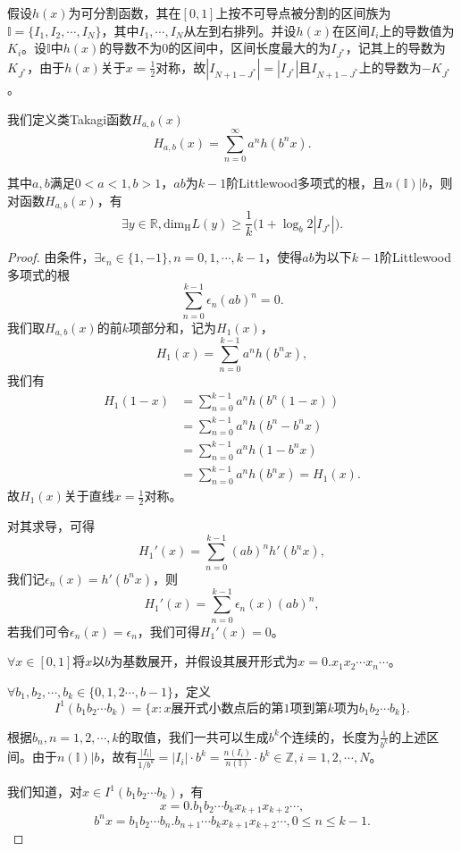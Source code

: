 假设$h(x)$为可分割函数，其在$[0,1]$上按不可导点被分割的区间族为$\mathbb{I}=\{I_1,I_2,\cdots,I_N\}$，其中$I_1,\cdots,I_N$从左到右排列。并设$h(x)$在区间$I_i$上的导数值为$K_i$。设$\mathbb{I}$中$h(x)$的导数不为$0$的区间中，区间长度最大的为$I_{J^*}$，记其上的导数为$K_{J^*}$，由于$h(x)$关于$x=\frac{1}{2}$对称，故$|I_{N+1-J^*}|=|I_{J^*}|$且$I_{N+1-J^*} $上的导数为$-K_{J^*}$。

我们定义类Takagi函数$H_{a,b}(x)$
$$
      H_{a,b}(x)=\sum_{n=0}^\infty a^nh(b^nx).
$$

其中$a,b$满足$0<a<1,b>1$，$ab$为$k-1$阶Littlewood多项式的根，且$n(\mathbb{I})|b$，则对函数$H_{a,b}(x)$，有
$$
      \exists y\in\mathbb{R},\mathrm{dim_H}L(y)\ge\frac{1}{k}\Big(1+\log_b2|I_{J^*}|\Big).
$$

\begin{proof}
由条件，$\exists \epsilon_n\in\{1,-1\},n=0,1,\cdots,k-1$，使得$ab$为以下$k-1$阶Littlewood多项式的根
$$
      \sum_{n=0}^{k-1}\epsilon_n(ab)^n=0.
$$
我们取$H_{a,b}(x)$的前$k$项部分和，记为$H_1(x)$，
$$
      H_1(x)=\sum_{n=0}^{k-1}a^nh(b^nx),
$$
我们有
$$
    \begin{aligned}
        H_1(1-x)&=\sum_{n=0}^{k-1}a^nh(b^n(1-x))\\
                &=\sum_{n=0}^{k-1}a^nh(b^n-b^nx)\\
                &=\sum_{n=0}^{k-1}a^nh(1-b^nx)\\
                &=\sum_{n=0}^{k-1}a^nh(b^nx)=H_1(x).
    \end{aligned}
$$
故$H_1(x)$关于直线$x=\frac{1}{2}$对称。

对其求导，可得
$$
      H_1'(x)=\sum_{n=0}^{k-1}(ab)^nh'(b^nx),
$$
我们记$\epsilon_n(x)=h'(b^nx)$，则
$$
      H_1'(x)=\sum_{n=0}^{k-1}\epsilon_n(x)(ab)^n,
$$
若我们可令$\epsilon_n(x)=\epsilon_n$，我们可得$H_1'(x)=0$。

$\forall x\in[0,1]$将$x$以$b$为基数展开，并假设其展开形式为$x=0.x_1x_2\cdots x_n\cdots$。

$\forall b_1,b_2,\cdots,b_k\in\{0,1,2\cdots,b-1\}$，定义
$$
      I^1(b_1b_2\cdots b_k)=\{x:x\mbox{展开式小数点后的第}1\mbox{项到第}k\mbox{项为}b_1b_2\cdots b_k\}.
$$

根据$b_n,n=1,2,\cdots,k$的取值，我们一共可以生成$b^k$个连续的，长度为$\frac{1}{b^k}$的上述区间。由于$n(\mathbb{I})|b$，故有$\frac{|I_i|}{1/b^k}=|I_i|\cdot b^k=\frac{n(I_i)}{n(\mathbb{I})}\cdot b^k\in\mathbb{Z},i=1,2,\cdots,N$。

我们知道，对$x\in I^1(b_1b_2\cdots b_k)$，有
$$
      x=0.b_1b_2\cdots b_kx_{k+1}x_{k+2}\cdots,
$$
$$
b^{n}x=b_1b_2\cdots b_{n}.b_{n+1}\cdots b_kx_{k+1}x_{k+2}\cdots,0\le n\le k-1.
$$


\end{proof}
